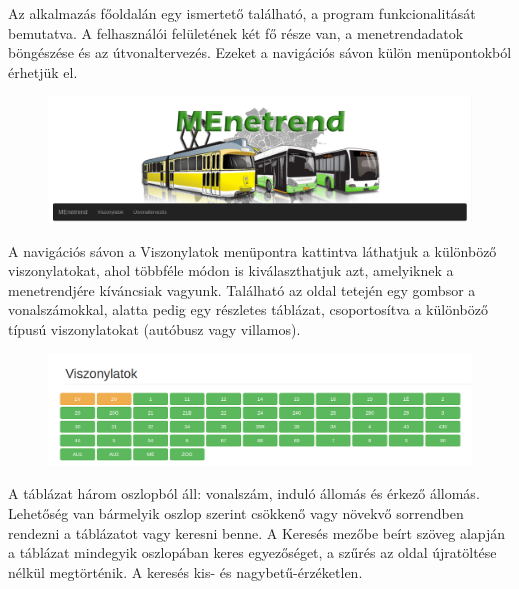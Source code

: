 



Az alkalmazás főoldalán egy ismertető található, a program funkcionalitását bemutatva.
A felhasználói felületének két fő része van, a menetrendadatok böngészése és az útvonaltervezés. Ezeket a navigációs sávon külön menüpontokból érhetjük el.

\begin{figure}[h!]
\centering
\includegraphics[scale=0.32]{kepek/navbar.png}
\caption{}
\label{fig:navbar}
\end{figure}

A navigációs sávon a Viszonylatok menüpontra kattintva láthatjuk a különböző viszonylatokat, ahol többféle módon is kiválaszthatjuk azt, amelyiknek a menetrendjére kíváncsiak vagyunk. Található az oldal tetején egy gombsor a vonalszámokkal, alatta pedig egy részletes táblázat, csoportosítva a különböző típusú viszonylatokat (autóbusz vagy villamos).

\begin{figure}[h!]
\centering
\includegraphics[scale=0.32]{kepek/viszonylatok_gombsor.png}
\caption{}
\label{fig:viszonylatok_gombsor}
\end{figure}

A táblázat három oszlopból áll: vonalszám, induló állomás és érkező állomás. Lehetőség van bármelyik oszlop szerint csökkenő vagy növekvő sorrendben rendezni a táblázatot vagy keresni benne. A Keresés mezőbe beírt szöveg alapján a táblázat mindegyik oszlopában keres egyezőséget, a szűrés az oldal újratöltése nélkül megtörténik. A keresés kis- és nagybetű-érzéketlen.

